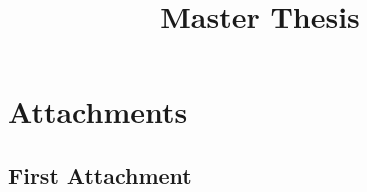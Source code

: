 \documentclass[12pt,a4paper]{report}
\let\openright=\clearpage
\begin{document}
\title{Master Thesis}



\tableofcontents


% 


% 
% 
% 
% 
% 





\listoffigures

\listoftables


\appendix
\chapter{Attachments}

\section{First Attachment}

\printindex

\openright
\end{document}
